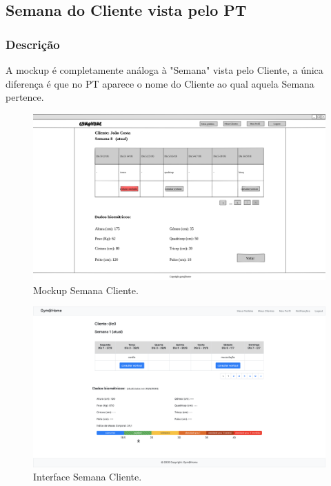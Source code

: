\subsection{Semana do Cliente vista pelo PT}
\label{subsec:semanacliente}

\subsubsection{Descrição}
\hspace{5mm} A mockup é completamente análoga à "Semana" vista pelo Cliente, a única diferença é que no PT aparece o nome do Cliente ao qual aquela Semana pertence.

\begin{figure}[H]
    \centering
    \includegraphics[scale=0.25]{images/mockups/pt_plano_do_cliente_semana_8_atual.png}
    \caption{Mockup Semana Cliente.}
    \label{fig:mockupsemanacliente}
\end{figure}

\begin{figure}[H]
    \centering
    \includegraphics[scale=0.25]{images/interfaces/pt_semana.png}
    \caption{Interface Semana Cliente.}
    \label{fig:interfacesemanacliente}
\end{figure}

